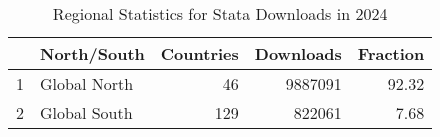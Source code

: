 \begin{table}[ht]
\centering
\begin{tabular}{rlrrr}
  \hline
 & North/South & Countries & Downloads & Fraction \\ 
  \hline
1 & Global North &  46 & 9887091 & 92.32 \\ 
  2 & Global South & 129 & 822061 & 7.68 \\ 
   \hline
\end{tabular}
\caption{Regional Statistics for Stata Downloads in 2024} 
\label{tab:stata_downloads_global_stats_2024}
\end{table}
